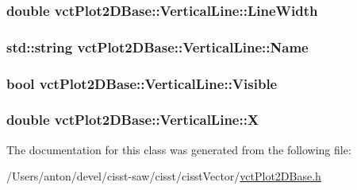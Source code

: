 \subsubsection[{Line\+Width}]{\setlength{\rightskip}{0pt plus 5cm}double vct\+Plot2\+D\+Base\+::\+Vertical\+Line\+::\+Line\+Width\hspace{0.3cm}{\ttfamily [protected]}}\label{classvct_plot2_d_base_1_1_vertical_line_a36cbedb02fb55b387933cd6db1782562}
\hypertarget{classvct_plot2_d_base_1_1_vertical_line_a5aa26599db259440cfa96c967835417d}{}
\subsubsection[{Name}]{\setlength{\rightskip}{0pt plus 5cm}std\+::string vct\+Plot2\+D\+Base\+::\+Vertical\+Line\+::\+Name\hspace{0.3cm}{\ttfamily [protected]}}\label{classvct_plot2_d_base_1_1_vertical_line_a5aa26599db259440cfa96c967835417d}
\hypertarget{classvct_plot2_d_base_1_1_vertical_line_a9f71e6ff1a3da3b6bf0f151720e277ca}{}
\subsubsection[{Visible}]{\setlength{\rightskip}{0pt plus 5cm}bool vct\+Plot2\+D\+Base\+::\+Vertical\+Line\+::\+Visible\hspace{0.3cm}{\ttfamily [protected]}}\label{classvct_plot2_d_base_1_1_vertical_line_a9f71e6ff1a3da3b6bf0f151720e277ca}
\hypertarget{classvct_plot2_d_base_1_1_vertical_line_a49c77c7144675b46d5a89342732b96eb}{}
\subsubsection[{X}]{\setlength{\rightskip}{0pt plus 5cm}double vct\+Plot2\+D\+Base\+::\+Vertical\+Line\+::\+X\hspace{0.3cm}{\ttfamily [protected]}}\label{classvct_plot2_d_base_1_1_vertical_line_a49c77c7144675b46d5a89342732b96eb}


The documentation for this class was generated from the following file\+:\begin{DoxyCompactItemize}
\item 
/\+Users/anton/devel/cisst-\/saw/cisst/cisst\+Vector/\hyperlink{vct_plot2_d_base_8h}{vct\+Plot2\+D\+Base.\+h}\end{DoxyCompactItemize}

